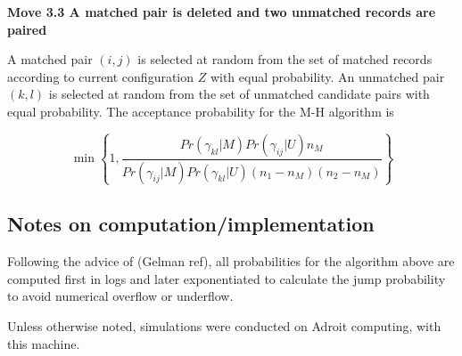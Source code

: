 \documentclass[11pt,reqno]{amsart}
\begin{document}
\textbf{Move 3.3 A matched pair is deleted and two unmatched records are paired}

A matched pair $(i,j)$ is selected at random from the set of matched records according to current configuration $Z$ with equal probability.  An unmatched pair $(k,l)$ is selected at random from the set of unmatched candidate pairs with equal probability.   The acceptance probability for the M-H algorithm is

\[ \min \left\{1,  \frac{Pr(\gamma_{kl} | M)Pr(\gamma_{ij} | U) n_M}{Pr(\gamma_{ij} | M) Pr(\gamma_{kl} | U) (n_1 - n_M)(n_2 - n_M)} \right\} \]

\subsection{Notes on computation/implementation}

Following the advice of (Gelman ref), all probabilities for the algorithm above are computed first in logs and later exponentiated to calculate the jump probability to avoid numerical overflow or underflow. 

Unless otherwise noted, simulations were conducted on Adroit computing, with this machine.  
\end{document}
